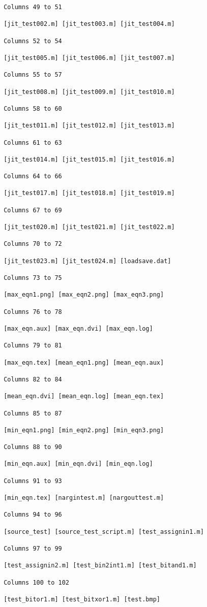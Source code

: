 \begin{verbatim}
 Columns 49 to 51

 [jit_test002.m] [jit_test003.m] [jit_test004.m] 

 Columns 52 to 54

 [jit_test005.m] [jit_test006.m] [jit_test007.m] 

 Columns 55 to 57

 [jit_test008.m] [jit_test009.m] [jit_test010.m] 

 Columns 58 to 60

 [jit_test011.m] [jit_test012.m] [jit_test013.m] 

 Columns 61 to 63

 [jit_test014.m] [jit_test015.m] [jit_test016.m] 

 Columns 64 to 66

 [jit_test017.m] [jit_test018.m] [jit_test019.m] 

 Columns 67 to 69

 [jit_test020.m] [jit_test021.m] [jit_test022.m] 

 Columns 70 to 72

 [jit_test023.m] [jit_test024.m] [loadsave.dat] 

 Columns 73 to 75

 [max_eqn1.png] [max_eqn2.png] [max_eqn3.png] 

 Columns 76 to 78

 [max_eqn.aux] [max_eqn.dvi] [max_eqn.log] 

 Columns 79 to 81

 [max_eqn.tex] [mean_eqn1.png] [mean_eqn.aux] 

 Columns 82 to 84

 [mean_eqn.dvi] [mean_eqn.log] [mean_eqn.tex] 

 Columns 85 to 87

 [min_eqn1.png] [min_eqn2.png] [min_eqn3.png] 

 Columns 88 to 90

 [min_eqn.aux] [min_eqn.dvi] [min_eqn.log] 

 Columns 91 to 93

 [min_eqn.tex] [nargintest.m] [nargouttest.m] 

 Columns 94 to 96

 [source_test] [source_test_script.m] [test_assignin1.m] 

 Columns 97 to 99

 [test_assignin2.m] [test_bin2int1.m] [test_bitand1.m] 

 Columns 100 to 102

 [test_bitor1.m] [test_bitxor1.m] [test.bmp] 


\end{verbatim}
